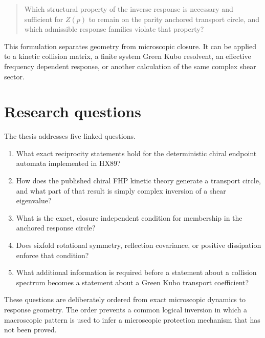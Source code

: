 \begin{quote}
Which structural property of the inverse response is necessary and sufficient for $Z(p)$ to remain on the parity anchored transport circle, and which admissible response families violate that property?
\end{quote}

This formulation separates geometry from microscopic closure. It can be applied to a kinetic collision matrix, a finite system Green Kubo resolvent, an effective frequency dependent response, or another calculation of the same complex shear sector.

\section{Research questions}
The thesis addresses five linked questions.

\begin{enumerate}[label=\arabic*.]
\item What exact reciprocity statements hold for the deterministic chiral endpoint automata implemented in HX89?
\item How does the published chiral FHP kinetic theory generate a transport circle, and what part of that result is simply complex inversion of a shear eigenvalue?
\item What is the exact, closure independent condition for membership in the anchored response circle?
\item Does sixfold rotational symmetry, reflection covariance, or positive dissipation enforce that condition?
\item What additional information is required before a statement about a collision spectrum becomes a statement about a Green Kubo transport coefficient?
\end{enumerate}

These questions are deliberately ordered from exact microscopic dynamics to response geometry. The order prevents a common logical inversion in which a macroscopic pattern is used to infer a microscopic protection mechanism that has not been proved.

